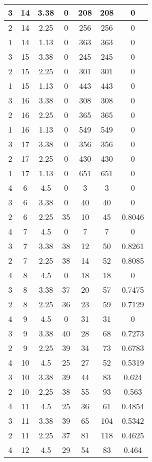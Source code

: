 \documentclass[letterpaper, 12pt]{article}
\begin{document}
\begin{longtable}{|c|c|c|c|c|c|c|}
\hline
3 & 14 & 3.38 & 0 & 208 & 208 & 0 \\
\hline
2 & 14 & 2.25 & 0 & 256 & 256 & 0 \\
\hline
1 & 14 & 1.13 & 0 & 363 & 363 & 0 \\
\hline
3 & 15 & 3.38 & 0 & 245 & 245 & 0 \\
\hline
2 & 15 & 2.25 & 0 & 301 & 301 & 0 \\
\hline
1 & 15 & 1.13 & 0 & 443 & 443 & 0 \\
\hline
3 & 16 & 3.38 & 0 & 308 & 308 & 0 \\
\hline
2 & 16 & 2.25 & 0 & 365 & 365 & 0 \\
\hline
1 & 16 & 1.13 & 0 & 549 & 549 & 0 \\
\hline
3 & 17 & 3.38 & 0 & 356 & 356 & 0 \\
\hline
2 & 17 & 2.25 & 0 & 430 & 430 & 0 \\
\hline
1 & 17 & 1.13 & 0 & 651 & 651 & 0 \\
\hline
4 & 6 & 4.5 & 0 & 3 & 3 & 0 \\
\hline
3 & 6 & 3.38 & 0 & 40 & 40 & 0 \\
\hline
2 & 6 & 2.25 & 35 & 10 & 45 & 0.8046 \\
\hline
4 & 7 & 4.5 & 0 & 7 & 7 & 0 \\
\hline
3 & 7 & 3.38 & 38 & 12 & 50 & 0.8261 \\
\hline
2 & 7 & 2.25 & 38 & 14 & 52 & 0.8085 \\
\hline
4 & 8 & 4.5 & 0 & 18 & 18 & 0 \\
\hline
3 & 8 & 3.38 & 37 & 20 & 57 & 0.7475 \\
\hline
2 & 8 & 2.25 & 36 & 23 & 59 & 0.7129 \\
\hline
4 & 9 & 4.5 & 0 & 31 & 31 & 0 \\
\hline
3 & 9 & 3.38 & 40 & 28 & 68 & 0.7273 \\
\hline
2 & 9 & 2.25 & 39 & 34 & 73 & 0.6783 \\
\hline
4 & 10 & 4.5 & 25 & 27 & 52 & 0.5319 \\
\hline
3 & 10 & 3.38 & 39 & 44 & 83 & 0.624 \\
\hline
2 & 10 & 2.25 & 38 & 55 & 93 & 0.563 \\
\hline
4 & 11 & 4.5 & 25 & 36 & 61 & 0.4854 \\
\hline
3 & 11 & 3.38 & 39 & 65 & 104 & 0.5342 \\
\hline
2 & 11 & 2.25 & 37 & 81 & 118 & 0.4625 \\
\hline
4 & 12 & 4.5 & 29 & 54 & 83 & 0.464 \\

\end{longtable}
\end{document}
